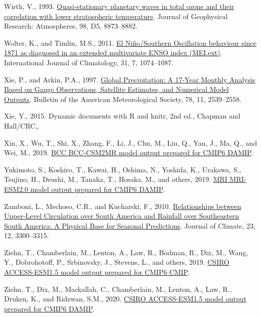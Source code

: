 \documentclass[12pt,oneside]{reedthesis}
\newlength{\cslhangindent}
\newenvironment{CSLReferences}[2] %
 {%
  \setlength{\parindent}{0pt}
  \ifodd #1 \everypar{\setlength{\hangindent}{\cslhangindent}}\ignorespaces\fi
  \ifnum #2 > 0
  \setlength{\parskip}{#2\baselineskip}
  \fi
 }%
 {}
\begin{document}
\begin{CSLReferences}{1}{0}
\leavevmode{}%
Wirth, V., 1993. \href{https://doi.org/10.1029/92JD02820}{Quasi-stationary planetary waves in total ozone and their correlation with lower stratospheric temperature}. Journal of Geophysical Research: Atmospheres, 98, D5, 8873--8882.

\leavevmode{}%
Wolter, K., and Timlin, M.S., 2011. \href{https://doi.org/10.1002/joc.2336}{El {Niño}/{Southern Oscillation} behaviour since 1871 as diagnosed in an extended multivariate {ENSO} index ({MEI}.ext)}. International Journal of Climatology, 31, 7, 1074--1087.

\leavevmode{}%
Xie, P., and Arkin, P.A., 1997. \href{https://doi.org/10.1175/1520-0477(1997)078\%3C2539:GPAYMA\%3E2.0.CO;2}{Global {Precipitation}: {A} 17-{Year Monthly Analysis Based} on {Gauge Observations}, {Satellite Estimates}, and {Numerical Model Outputs}}. Bulletin of the American Meteorological Society, 78, 11, 2539--2558.

\leavevmode{}%
Xie, Y., 2015. Dynamic documents with {R} and knitr, 2nd ed., {Chapman and Hall/CRC},.

\leavevmode{}%
Xin, X., Wu, T., Shi, X., Zhang, F., Li, J., Chu, M., Liu, Q., Yan, J., Ma, Q., and Wei, M., 2019. \href{https://doi.org/10.22033/ESGF/CMIP6.1726}{BCC BCC-CSM2MR model output prepared for CMIP6 DAMIP}.

\leavevmode{}%
Yukimoto, S., Koshiro, T., Kawai, H., Oshima, N., Yoshida, K., Urakawa, S., Tsujino, H., Deushi, M., Tanaka, T., Hosaka, M., and others, 2019. \href{https://doi.org/10.22033/ESGF/CMIP6.634}{MRI MRI-ESM2.0 model output prepared for CMIP6 DAMIP}.

\leavevmode{}%
Zamboni, L., Mechoso, C.R., and Kucharski, F., 2010. \href{https://doi.org/10.1175/2009JCLI3129.1}{Relationships between {Upper-Level Circulation} over {South America} and {Rainfall} over {Southeastern South America}: {A Physical Base} for {Seasonal Predictions}}. Journal of Climate, 23, 12, 3300--3315.

\leavevmode{}%
Ziehn, T., Chamberlain, M., Lenton, A., Law, R., Bodman, R., Dix, M., Wang, Y., Dobrohotoff, P., Srbinovsky, J., Stevens, L., and others, 2019. \href{https://doi.org/10.22033/ESGF/CMIP6.2288}{CSIRO ACCESS-ESM1.5 model output prepared for CMIP6 CMIP}.

\leavevmode{}%
Ziehn, T., Dix, M., Mackallah, C., Chamberlain, M., Lenton, A., Law, R., Druken, K., and Ridzwan, S.M., 2020. \href{https://doi.org/10.22033/ESGF/CMIP6.14362}{CSIRO ACCESS-ESM1.5 model output prepared for CMIP6 DAMIP}.

\end{CSLReferences}


\end{document}
